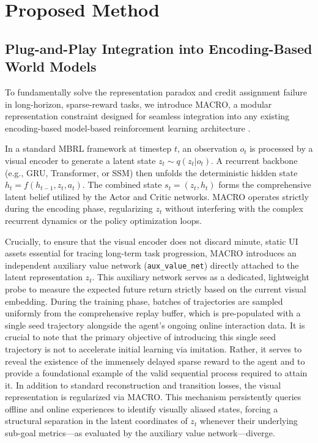 \documentclass{article} %
\begin{document}
\section{Proposed Method}

\subsection{Plug-and-Play Integration into Encoding-Based World Models}
To fundamentally solve the representation paradox and credit assignment failure in long-horizon, sparse-reward tasks, we introduce MACRO, a modular representation constraint designed for seamless integration into any existing encoding-based model-based reinforcement learning architecture \citep[e.g., DreamerV3, STORM, DRAMA;][]{hafner2025mastering, zhang2023storm, wang2025drama}.

In a standard MBRL framework at timestep $t$, an observation $o_t$ is processed by a visual encoder to generate a latent state $z_t \sim q(z_t | o_t)$. A recurrent backbone (e.g., GRU, Transformer, or SSM) then unfolds the deterministic hidden state $h_t = f(h_{t-1}, z_t, a_t)$. The combined state $s_t = (z_t, h_t)$ forms the comprehensive latent belief utilized by the Actor and Critic networks. MACRO operates strictly during the encoding phase, regularizing $z_t$ without interfering with the complex recurrent dynamics or the policy optimization loops.

Crucially, to ensure that the visual encoder does not discard minute, static UI assets essential for tracing long-term task progression, MACRO introduces an independent auxiliary value network (\texttt{aux\_value\_net}) directly attached to the latent representation $z_t$. This auxiliary network serves as a dedicated, lightweight probe to measure the expected future return strictly based on the current visual embedding. During the training phase, batches of trajectories are sampled uniformly from the comprehensive replay buffer, which is pre-populated with a single seed trajectory alongside the agent's ongoing online interaction data. It is crucial to note that the primary objective of introducing this single seed trajectory is not to accelerate initial learning via imitation. Rather, it serves to reveal the existence of the immensely delayed sparse reward to the agent and to provide a foundational example of the valid sequential process required to attain it. In addition to standard reconstruction and transition losses, the visual representation is regularized via MACRO. This mechanism persistently queries offline and online experiences to identify visually aliased states, forcing a structural separation in the latent coordinates of $z_t$ whenever their underlying sub-goal metrics—as evaluated by the auxiliary value network—diverge.
\end{document}
